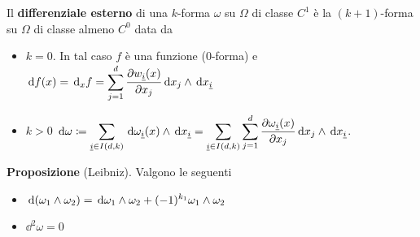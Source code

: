 Il \textbf{differenziale esterno} di una $k$-forma $\omega$ su $\Omega$ di classe $C^1$ è la $(k+1)$-forma su $\Omega$ di classe almeno $C^0$ data da
\begin{itemize}

	\item $k=0$. In tal caso $f$ è una funzione (0-forma) e $\displaystyle \,\mathrm{d} f(x) = \,\mathrm{d}_x f = \sum_{j=1}^d \frac{\partial w_{\underline{i}}(x)}{\partial x_j} \,\mathrm{d} x_j \wedge \,\mathrm{d} x_{\underline{i}}$


	\item $k > 0$ $\displaystyle \,\mathrm{d} \omega \coloneqq \sum_{\underline{i} \in I(d,k)} \,\mathrm{d} \omega_{\underline{i}} (x) \wedge \,\mathrm{d} x_{\underline{i}} = \sum_{\underline{i} \in I(d,k)} \sum_{j=1}^d \frac{\partial \omega_{\underline{i}}(x)}{\partial x_j} \,\mathrm{d} x_j \wedge \,\mathrm{d} x_{\underline{i}}$.

\end{itemize}

\textbf{Proposizione} (Leibniz). Valgono le seguenti
\begin{itemize}

	\item $\displaystyle \,\mathrm{d} (\omega_1 \wedge \omega_2) = \,\mathrm{d} \omega_1 \wedge \omega_2 + (-1)^{k_1} \omega_1 \wedge \omega_2$

	\item $\dd^2 \omega = 0$
\end{itemize}
